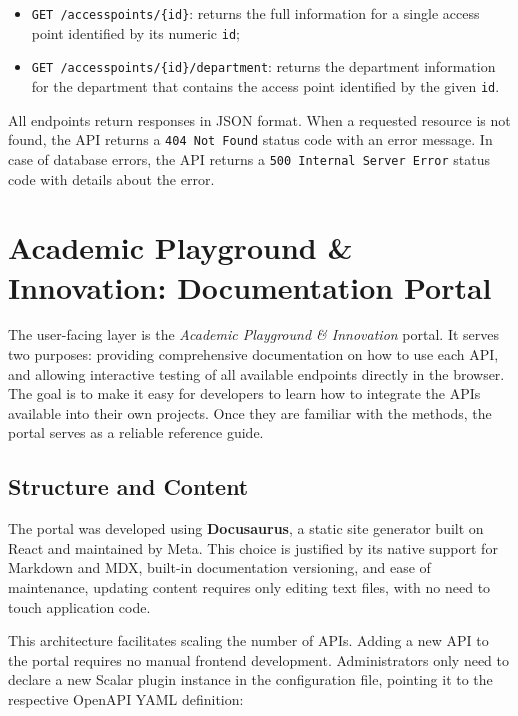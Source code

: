 \documentclass[12pt, a4paper]{report}
\begin{document}
\begin{itemize}
\begin{itemize}
              associated department;
        \item \textbf{min\_bandwidth}: filters access points to include only those with
              a maximum bandwidth capacity greater than or equal to the specified value
              in Mbps.
    \end{itemize}
    \item \texttt{GET /accesspoints/\{id\}}: returns the full information for a single
          access point identified by its numeric \texttt{id};
    \item \texttt{GET /accesspoints/\{id\}/department}: returns the department information
          for the department that contains the access point identified by the given \texttt{id}.
\end{itemize}

All endpoints return responses in JSON format. When a requested resource is not found, the API
returns a \texttt{404 Not Found} status code with an error message. In case of
database errors, the API returns a \texttt{500 Internal Server Error} status code with details
about the error.


\section{Academic Playground \& Innovation: Documentation Portal}

The user-facing layer is the \textit{Academic Playground \& Innovation} portal. It serves
two purposes: providing comprehensive documentation on how to use each API, and allowing interactive
testing of all available endpoints directly in the browser. The goal is to make it
easy for developers to learn how to integrate the APIs available into their own projects. Once
they are familiar with the methods, the portal serves as a reliable reference guide.

\subsection{Structure and Content}
The portal was developed using \textbf{Docusaurus}, a static site generator built on
React and maintained by Meta. This choice is justified by its native support for Markdown
and MDX, built-in documentation versioning, and ease of maintenance, updating content
requires only editing text files, with no need to touch application code.

This architecture facilitates scaling the number of APIs. Adding a new API to the portal requires no manual frontend development. Administrators only need to declare a new Scalar plugin instance in the configuration file, pointing it to the respective OpenAPI YAML definition:
\end{document}
